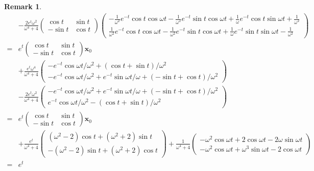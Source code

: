 \documentclass{jsarticle}
\newtheorem{remark}{Remark}
\begin{document}
\begin{remark}
\begin{align}
&-\frac{2e^{t}\omega^{2}}{\omega^{4}+4}
\begin{pmatrix}
\cos t & \sin t\\
-\sin t & \cos t
\end{pmatrix}
\begin{pmatrix}
-\frac{1}{\omega^{2}}e^{-t}\cos t\cos\omega t
-\frac{1}{\omega^{2}}e^{-t}\sin t\cos\omega t
+\frac{1}{\omega}e^{-t}\cos t\sin\omega t
+\frac{1}{\omega^{2}}\\
\frac{1}{\omega^{2}}e^{-t}\cos t\cos\omega t
-\frac{1}{\omega^{2}}e^{-t}\sin t\cos\omega t
+\frac{1}{\omega}e^{-t}\sin t\sin\omega t
-\frac{1}{\omega^{2}}
\end{pmatrix}\\
=&e^{t}
\begin{pmatrix}
\cos t & \sin t\\
-\sin t & \cos t
\end{pmatrix}
\boldsymbol{x}_{0}\\
&+\frac{e^{t}\omega^{4}}{\omega^{4}+4}
\begin{pmatrix}
-e^{-t}\cos\omega t/\omega^{2}+(\cos t+\sin t)/\omega^{2}\\
-e^{-t}\cos\omega t/\omega^{2}+e^{-t}\sin\omega t/\omega
+(-\sin t+\cos t)/\omega^{2}
\end{pmatrix}\\
&-\frac{2e^{t}\omega^{2}}{\omega^{4}+4}
\begin{pmatrix}
-e^{-t}\cos\omega t/\omega^{2}+e^{-t}\sin\omega t/\omega
+(-\sin t+\cos t)/\omega^{2}\\
e^{-t}\cos\omega t/\omega^{2}-(\cos t+\sin t)/\omega^{2}
\end{pmatrix}\\
=&e^{t}
\begin{pmatrix}
\cos t & \sin t\\
-\sin t & \cos t
\end{pmatrix}
\boldsymbol{x}_{0}\\
&+\frac{e^{t}}{\omega^{4}+4}
\begin{pmatrix}
(\omega^{2}-2)\cos t+(\omega^{2}+2)\sin t\\
-(\omega^{2}-2)\sin t+(\omega^{2}+2)\cos t
\end{pmatrix}
+\frac{1}{\omega^{4}+4}
\begin{pmatrix}
-\omega^{2}\cos\omega t+2\cos\omega t-2\omega\sin\omega t\\
-\omega^{2}\cos\omega t+\omega^{3}\sin\omega t-2\cos\omega t
\end{pmatrix}\\
=&e^{t}

\end{align}
\end{remark}
\end{document}
